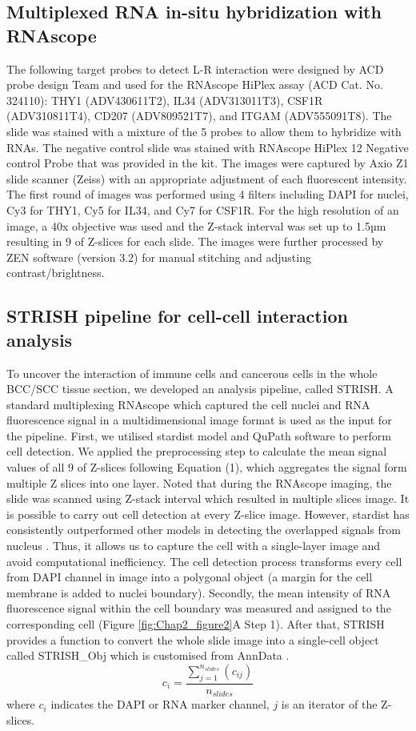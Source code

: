 \subsection{Multiplexed RNA in-situ hybridization with RNAscope}
The following target probes to detect L-R interaction were designed by ACD probe design Team and used for the RNAscope HiPlex assay (ACD Cat. No. 324110): THY1 (ADV430611T2), IL34 (ADV313011T3), CSF1R (ADV310811T4), CD207 (ADV809521T7), and ITGAM (ADV555091T8). The slide was stained with a mixture of the 5 probes to allow them to hybridize with RNAs. The negative control slide was stained with RNAscope HiPlex 12 Negative control Probe that was provided in the kit. The images were captured by Axio Z1 slide scanner (Zeiss) with an appropriate adjustment of each fluorescent intensity. The first round of images was performed using 4 filters including DAPI for nuclei, Cy3 for THY1, Cy5 for IL34, and Cy7 for CSF1R. For the high resolution of an image, a 40x objective was used and the Z-stack interval was set up to 1.5µm resulting in 9 of Z-slices for each slide. The images were further processed by ZEN software (version 3.2) for manual stitching and adjusting contrast/brightness.

\subsection{STRISH pipeline for cell-cell interaction analysis}
To uncover the interaction of immune cells and cancerous cells in the whole BCC/SCC tissue section, we developed an analysis pipeline, called STRISH. A standard multiplexing RNAscope which captured the cell nuclei and RNA fluorescence signal in a multidimensional image format is used as the input for the pipeline. First, we utilised stardist \cite{schmidt2018cell} model and QuPath software \cite{bankhead2017qupath} to perform cell detection. We applied the preprocessing step to calculate the mean signal values of all 9 of Z-slices following Equation (1), which aggregates the signal form multiple Z slices into one layer. Noted that during the RNAscope imaging, the slide was scanned using Z-stack interval which resulted in multiple slices image. It is possible to carry out cell detection at every Z-slice image. However, stardist has consistently outperformed other models in detecting the overlapped signals from nucleus \cite{schmidt2018cell}. Thus, it allows us to capture the cell with a single-layer image and avoid computational inefficiency. The cell detection process transforms every cell from DAPI channel in image into a polygonal object (a margin for the cell membrane is added to nuclei boundary). Secondly, the mean intensity of RNA fluorescence signal within the cell boundary was measured and assigned to the corresponding cell (Figure \ref{fig:Chap2_figure2}A Step 1). After that, STRISH provides a function to convert the whole slide image into a single-cell object called STRISH\_Obj which is customised from AnnData \cite{wolf2018scanpy}. 
\begin{equation}
c_{i} = \frac{\sum_{j=1}^{n_{slides}}(c_{ij})}{n_{slides}}
\label{chap2:eq:01}
\end{equation}
where $c_i$ indicates the DAPI or RNA marker channel, $j$ is an iterator of the Z-slices.

